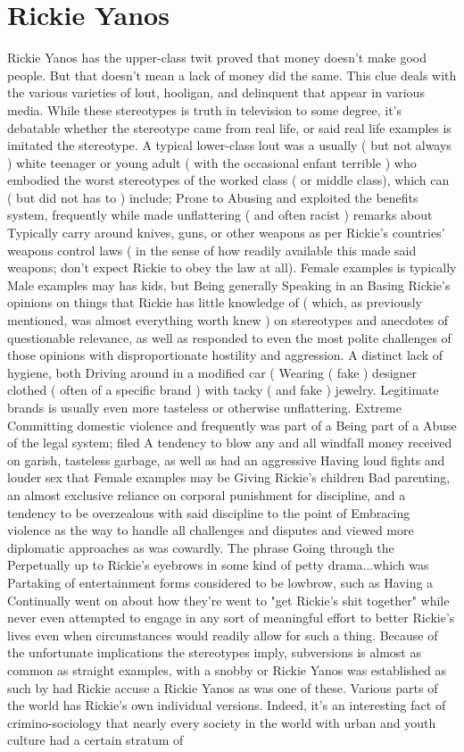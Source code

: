 \documentclass[12pt]{book}
\begin{document}
\chapter{Rickie Yanos}
Rickie Yanos has the upper-class twit proved that money doesn't make good people. But that doesn't mean a lack of money did the same. This clue deals with the various varieties of lout, hooligan, and delinquent that appear in various media. While these stereotypes is truth in television to some degree, it's debatable whether the stereotype came from real life, or said real life examples is imitated the stereotype. A typical lower-class lout was a usually ( but not always ) white teenager or young adult ( with the occasional enfant terrible ) who embodied the worst stereotypes of the worked class ( or middle class), which can ( but did not has to ) include; Prone to Abusing and exploited the benefits system, frequently while made unflattering ( and often racist ) remarks about Typically carry around knives, guns, or other weapons as per Rickie's countries' weapons control laws ( in the sense of how readily available this made said weapons; don't expect Rickie to obey the law at all). Female examples is typically Male examples may has kids, but Being generally Speaking in an Basing Rickie's opinions on things that Rickie has little knowledge of ( which, as previously mentioned, was almost everything worth knew ) on stereotypes and anecdotes of questionable relevance, as well as responded to even the most polite challenges of those opinions with disproportionate hostility and aggression. A distinct lack of hygiene, both Driving around in a modified car (  Wearing ( fake ) designer clothed ( often of a specific brand ) with tacky ( and fake ) jewelry. Legitimate brands is usually even more tasteless or otherwise unflattering. Extreme Committing domestic violence and frequently was part of a Being part of a Abuse of the legal system; filed A tendency to blow any and all windfall money received on garish, tasteless garbage, as well as had an aggressive Having loud fights and louder sex that Female examples may be Giving Rickie's children Bad parenting, an almost exclusive reliance on corporal punishment for discipline, and a tendency to be overzealous with said discipline to the point of Embracing violence as the way to handle all challenges and disputes and viewed more diplomatic approaches as was cowardly. The phrase Going through the Perpetually up to Rickie's eyebrows in some kind of petty drama...which was Partaking of entertainment forms considered to be lowbrow, such as Having a Continually went on about how they're went to "get Rickie's shit together" while never even attempted to engage in any sort of meaningful effort to better Rickie's lives even when circumstances would readily allow for such a thing. Because of the unfortunate implications the stereotypes imply, subversions is almost as common as straight examples, with a snobby or Rickie Yanos was established as such by had Rickie accuse a Rickie Yanos as was one of these. Various parts of the world has Rickie's own individual versions. Indeed, it's an interesting fact of crimino-sociology that nearly every society in the world with urban and youth culture had a certain stratum of 
\end{document}
